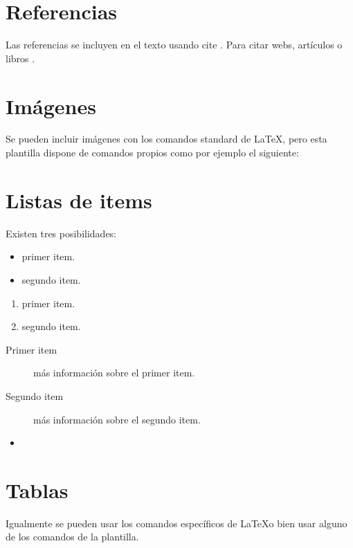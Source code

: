 \section{Referencias}

Las referencias se incluyen en el texto usando cite \cite{wiki:latex}. Para citar webs, artículos o libros \cite{koza92}.

\section{Imágenes}

Se pueden incluir imágenes con los comandos standard de \LaTeX, pero esta plantilla dispone de comandos propios como por ejemplo el siguiente:

\section{Listas de items}

Existen tres posibilidades:

\begin{itemize}
	\item primer item.
	\item segundo item.
\end{itemize}

\begin{enumerate}
	\item primer item.
	\item segundo item.
\end{enumerate}

\begin{description}
	\item[Primer item] más información sobre el primer item.
	\item[Segundo item] más información sobre el segundo item.
\end{description}
	
\begin{itemize}
\item 
\end{itemize}

\section{Tablas}

Igualmente se pueden usar los comandos específicos de \LaTeX o bien usar alguno de los comandos de la plantilla.


